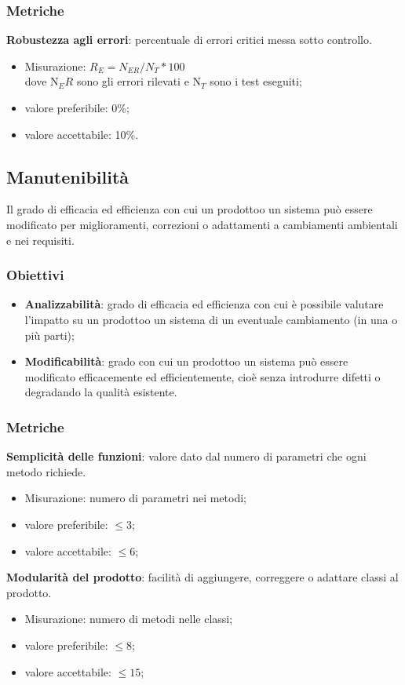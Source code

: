         \subsubsection{Metriche}
            \textbf{Robustezza agli errori}: percentuale di errori critici messa sotto controllo.
                \begin{itemize}
                    \item Misurazione: $R_E=N_{ER}/N_{T}*100$ \\
                    dove N$_ER$ sono gli errori rilevati e N$_T$ sono i test eseguiti;
                    \item valore preferibile: 0\%;
                    \item valore accettabile: 10\%.
                \end{itemize}
    \subsection{Manutenibilità}
        Il grado di efficacia ed efficienza con cui un prodotto\glosp o un sistema può essere modificato per miglioramenti, correzioni o adattamenti a cambiamenti ambientali e nei requisiti.
        \subsubsection{Obiettivi}
        \begin{itemize}
            \item \textbf{Analizzabilità}: grado di efficacia ed efficienza con cui è possibile valutare l'impatto su un prodotto\glosp o un sistema di un eventuale cambiamento (in una o più parti);
            \item \textbf{Modificabilità}: grado con cui un prodotto\glosp o un sistema può essere modificato efficacemente ed efficientemente, cioè senza introdurre difetti o degradando la qualità esistente.
        \end{itemize}
        \subsubsection{Metriche}
            \textbf{Semplicità delle funzioni}: valore dato dal numero di parametri che ogni metodo richiede.
                \begin{itemize}
                    \item Misurazione: numero di parametri nei metodi;
                    \item valore preferibile: $\leq 3$;
                    \item valore accettabile: $\leq 6$;
                \end{itemize}
            \textbf{Modularità del prodotto}: facilità di aggiungere, correggere o adattare classi al prodotto\glo.
                \begin{itemize}
                    \item Misurazione: numero di metodi nelle classi;
                    \item valore preferibile: $\leq 8$;
                    \item valore accettabile: $\leq 15$;
                \end{itemize}
